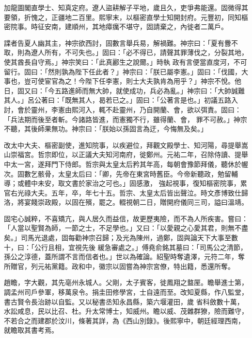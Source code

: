 \begin{pinyinscope}
 加龍圖閣直學士、知真定府。遼人盜耕解子平地，歲且久，吏爭弗能還。固微得其要領，折愧之，正疆地二百里。熙寧末，以樞密直學士知開封府。元豐初，同知樞密院事。時征安南，建順州，其地瘴癘不堪守，固請棄之，內徙者二萬戶。



 諜者告夏人幽其主，神宗欲西討，固數言舉兵易，解禍難。神宗曰：「夏有釁不取，則為遼人所有，不可失也。」固曰：「必不得已，請聲其罪薄伐之，分裂其地，使其酋長自守焉。」神宗笑曰：「此真酈生之說爾。」時執
 政有言便當直度河，不可留行。固曰：「然則孰為陛下任此者？」神宗曰：「朕已屬李憲。」固曰：「伐國，大事也，豈可使宦官為之！今陛下任李憲，則士大夫孰肯為用乎？」神宗不悅。他日，固又曰：「今五路進師而無大帥，就使成功，兵必為亂。」神宗曰：「大帥誠難其人。」呂公著曰：「既無其人，曷若已之。」固曰：「公著言是也。」初議五路入討，會於靈州，李憲由熙河入，輒不赴靈州，乃自開蘭、會，欲以弭責。固曰：「兵法期而後至者斬。今諸路皆進，而憲獨不行，雖得蘭、會，
 罪不可赦。」神宗不聽，其後師果無功。神宗曰：「朕始以孫固言為迂，今悔無及矣。」



 改太中大夫、樞密副使，進知院事，以疾避位，拜觀文殿學士、知河陽，尋提舉嵩山崇福宮。哲宗即位，以正議大夫知河南府，徙鄭州。元祐二年，召除侍讀、提舉中太一宮，遂拜門下侍郎。哲宗與太皇太后矜其年高，每朝會豫節拜儀，聽休於幄次。固數乞骸骨，太皇太后曰：「卿，先帝在東宮時舊臣。今帝新聽政，勉留輔導；或體中未安，取文書於家治之可也。」固感激，
 強起視事，復知樞密院事，累官右光祿大夫。五年，卒，年七十五。哲宗、太皇太后皆出聲泣。時文彥博致仕歸洛，將宴餞崇政殿，以固在殯，罷之。輟視朝二日，贈開府儀同三司，謚曰溫靖。



 固宅心誠粹，不喜矯亢，與人居久而益信，故更歷夷險，而不為人所疾害。嘗曰：「人當以聖賢為師，一節之士，不足學也。」又曰：「以愛親之心愛其君，則無不盡矣。」司馬光退處，固每勸神宗召歸；及光為陳州，過鄭，固與論天下大事至數十，曰：「公行且相，宜視先後
 緩急審處之。」傅堯俞銘其墓曰：「司馬公之清節，孫公之淳德，蓋所謂不言而信者也。」世以為確論。紹聖時奪遺澤，元符二年，奪所贈官，列元祐黨籍。政和中，徽宗以固嘗為神宗宮僚，特出籍，悉還所奪。



 趙瞻，字大觀，其先亳州永城人。父剛，太子賓客，徙鳳翔之盩厔。瞻舉進士第，調孟州司戶參軍，移萬泉令。捐圭田修學宮，士自遠而至。改知夏縣，作八監堂，書古賢令長治跡以自監。又以秘書丞知永昌縣，築六堰灌田，歲
 省科斂數十萬，水訟咸息，民以比召、杜。升太常博士，知威州。瞻以威、茂雜群獠，險而難守，不若合之而建郡於汶川，條著其詳，為《西山別錄》。後熙寧中，朝廷經理西南，就瞻取其書考焉。




\end{pinyinscope}
